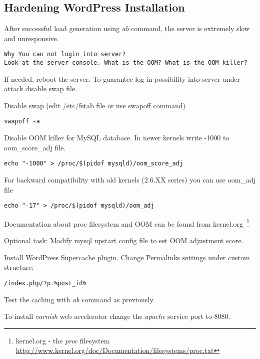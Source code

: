 \subsection{Hardening WordPress Installation}
After successful load generation using \emph{ab} command, the server is extremely slow and unresponsive.

\begin{Verbatim}[samepage=true,frame=single,
label=Discussion,framesep=2mm,rulecolor=\color{blue},commandchars=\\\{\}]
Why You can not login into server?
Look at the server console. What is the OOM? What is the OOM killer?
\end{Verbatim}


If needed, reboot the server. To  guarantee log in possibility into server under attack disable swap file.

Disable swap (edit /etc/fstab file or use swapoff command)


\begin{verbatim}
swapoff -a
\end{verbatim}

Disable OOM killer for MySQL database. In newer kernels write -1000 to oom\_score\_adj file.

\begin{verbatim}
echo "-1000" > /proc/$(pidof mysqld)/oom_score_adj
\end{verbatim}
For backward compatibility with old kernels (2.6.XX series) you can use oom\_adj file
\begin{verbatim}
echo "-17" > /proc/$(pidof mysqld)/oom_adj
\end{verbatim}
Documentation about proc filesystem and OOM can be found from kernel.org~\footnote{kernel.org - the \emph{proc} filesystem \url{http://www.kernel.org/doc/Documentation/filesystems/proc.txt}}

Optional task: Modify mysql upstart config file to set OOM adjustment score.


Install WordPress Supercache plugin.
Change Permalinks settings under custom structure:
\begin{verbatim}
/index.php/?p=%post_id%
\end{verbatim}
Test the caching with \emph{ab} command as previously.

To install \emph{varnish} web accelerator change the \emph{apache} service port to 8080.

